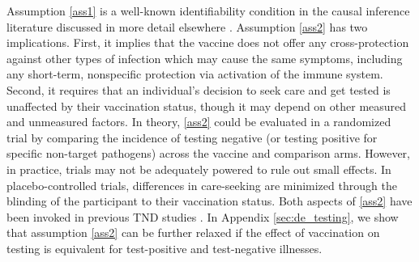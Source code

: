 \documentclass[11pt]{article}
\begin{document}
Assumption \ref{ass1} is a well-known identifiability condition in the causal inference literature discussed in more detail elsewhere \cite{hernan_causal_2020}. Assumption \ref{ass2} has two implications. First, it implies that the vaccine does not offer any cross-protection against other types of infection which may cause the same symptoms, including any short-term, nonspecific protection via activation of the immune system. Second, it requires that an individual's decision to seek care and get tested is unaffected by their vaccination status, though it may depend on other measured and unmeasured factors. In theory, \ref{ass2} could be evaluated in a randomized trial by comparing the incidence of testing negative (or testing positive for specific non-target pathogens) across the vaccine and comparison arms. However, in practice, trials may not be adequately powered to rule out small effects. In placebo-controlled trials, differences in care-seeking are minimized through the blinding of the participant to their vaccination status. Both aspects of \ref{ass2} have been invoked in previous TND studies \cite{jackson_test-negative_2013,feng_assessment_2017,schnitzer_estimands_2022}. In Appendix \ref{sec:de_testing}, we show that assumption \ref{ass2} can be further relaxed if the effect of vaccination on testing is equivalent for test-positive and test-negative illnesses.
\end{document}
